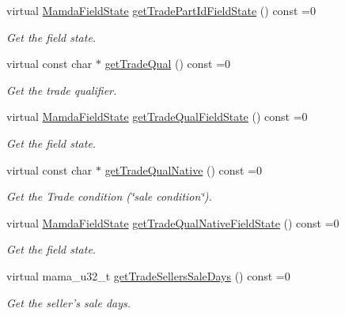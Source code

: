 \begin{CompactItemize}
virtual \hyperlink{namespaceWombat_93aac974f2ab713554fd12a1fa3b7d2a}{Mamda\-Field\-State} \hyperlink{classWombat_1_1MamdaTradeOutOfSequence_9619c7b6e64c238b0a56171bcb2442a4}{get\-Trade\-Part\-Id\-Field\-State} () const =0
\begin{CompactList}\small\item\em Get the field state. \item\end{CompactList}\item 
virtual const char $\ast$ \hyperlink{classWombat_1_1MamdaTradeOutOfSequence_b1fd563edcdc54c1fbce4c95281bd9b2}{get\-Trade\-Qual} () const =0
\begin{CompactList}\small\item\em Get the trade qualifier. \item\end{CompactList}\item 
virtual \hyperlink{namespaceWombat_93aac974f2ab713554fd12a1fa3b7d2a}{Mamda\-Field\-State} \hyperlink{classWombat_1_1MamdaTradeOutOfSequence_4886c647fdfa89dd2bef09bb264f8893}{get\-Trade\-Qual\-Field\-State} () const =0
\begin{CompactList}\small\item\em Get the field state. \item\end{CompactList}\item 
virtual const char $\ast$ \hyperlink{classWombat_1_1MamdaTradeOutOfSequence_3364a708c76898275745e1f542d76bc7}{get\-Trade\-Qual\-Native} () const =0
\begin{CompactList}\small\item\em Get the Trade condition (\char`\"{}sale condition\char`\"{}). \item\end{CompactList}\item 
virtual \hyperlink{namespaceWombat_93aac974f2ab713554fd12a1fa3b7d2a}{Mamda\-Field\-State} \hyperlink{classWombat_1_1MamdaTradeOutOfSequence_14b366022a0e2dd71b09b6d4693f44da}{get\-Trade\-Qual\-Native\-Field\-State} () const =0
\begin{CompactList}\small\item\em Get the field state. \item\end{CompactList}\item 
virtual mama\_\-u32\_\-t \hyperlink{classWombat_1_1MamdaTradeOutOfSequence_c397454fff2397f0da68132f3eaec372}{get\-Trade\-Sellers\-Sale\-Days} () const =0
\begin{CompactList}\small\item\em Get the seller's sale days. \item\end{CompactList}\item 

\end{CompactItemize}
